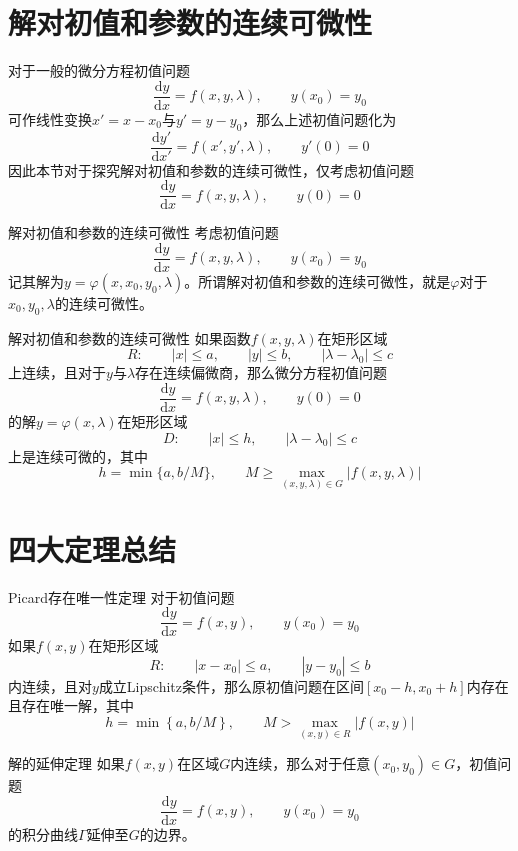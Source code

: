 \documentclass[lang = cn, scheme = chinese, thmcnt = section]{elegantbook}
\newcommand{\dd}{\mathrm{d}}           %
\begin{document}
\section{解对初值和参数的连续可微性}

对于一般的微分方程初值问题
$$
\frac{\dd y}{\dd x}=f(x,y,\lambda),\qquad 
y(x_0)=y_0
$$
可作线性变换$x'=x-x_0$与$y'=y-y_0$，那么上述初值问题化为
$$
\frac{\dd y'}{\dd x'}=f(x',y',\lambda),\qquad 
y'(0)=0
$$
因此本节对于探究解对初值和参数的连续可微性，仅考虑初值问题
$$
\frac{\dd y}{\dd x}=f(x,y,\lambda),\qquad 
y(0)=0
$$

\begin{definition}{解对初值和参数的连续可微性}
	考虑初值问题%
	$$
	\frac{\dd y}{\dd x}=f(x,y,\lambda),\qquad 
	y(x_0)=y_0
	$$
	记其解为$y=\varphi(x,x_0,y_0,\lambda)$。所谓解对初值和参数的连续可微性，就是$\varphi$对于$x_0,y_0,\lambda$的连续可微性。
\end{definition}

\begin{theorem}{解对初值和参数的连续可微性}
	如果函数$f(x,y,\lambda)$在矩形区域%
	$$
	R:\qquad 
	|x|\le a,\qquad 
	|y|\le b,\qquad 
	|\lambda-\lambda_0|\le c
	$$
	上连续，且对于$y$与$\lambda$存在连续偏微商，那么微分方程初值问题
	$$
	\frac{\dd y}{\dd x}=f(x,y,\lambda),\qquad 
	y(0)=0
	$$
	的解$y=\varphi(x,\lambda)$在矩形区域%
	$$
	D:\qquad 
	|x|\le h,\qquad 
	|\lambda-\lambda_0|\le c
	$$
	上是连续可微的，其中%
	$$
	h=\min\{ a,b/M \},\qquad 
	M\ge \max_{(x,y,\lambda)\in G}|f(x,y,\lambda)|
	$$
\end{theorem}

\section{四大定理总结}

\begin{theorem}{Picard存在唯一性定理}
	对于初值问题
	$$
	\frac{\dd y}{\dd x}=f(x,y),\qquad 
	y(x_0)=y_0
	$$
	如果$f(x,y)$在矩形区域
	$$
	R:\qquad 
	|x-x_0|\le a,\qquad 
	|y-y_0|\le b
	$$
	内连续，且对$y$成立Lipschitz条件，那么原初值问题在区间$[x_0-h,x_0+h]$内存在且存在唯一解，其中
	$$
	h=\min{\left\{a,b/M\right\}},\qquad 
	M>\max_{(x,y)\in{R}}{|f(x,y)|}
	$$
\end{theorem}

\begin{theorem}{解的延伸定理}
	如果$f(x,y)$在区域$G$内连续，那么对于任意$(x_0,y_0)\in G$，初值问题
	$$
	\frac{\dd y}{\dd x}=f(x,y),\qquad 
	y(x_0)=y_0
	$$
	的积分曲线$\Gamma$延伸至$G$的边界。
\end{theorem}
\end{document}
